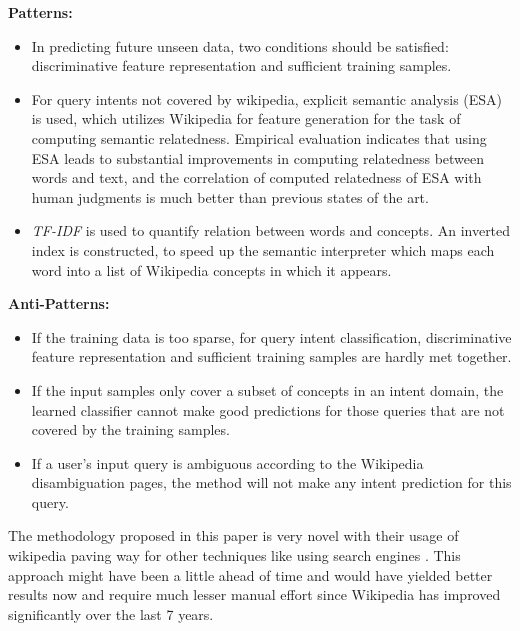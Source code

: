 \documentclass{report}
\begin{document}
\textbf{Patterns:}
\begin{itemize}
\item In predicting future unseen data, two conditions should be satisfied: discriminative feature 
representation and sufficient training samples.
\item For query intents not covered by wikipedia, explicit semantic analysis (ESA) is used, which utilizes
Wikipedia for feature generation for the task of computing semantic relatedness. Empirical evaluation 
indicates that using ESA leads to substantial improvements in computing relatedness between words and text, 
and the correlation of computed relatedness of ESA with human judgments is much better than previous states
of the art.
\item \textit{TF-IDF} is used to quantify relation between words and concepts. An inverted index is constructed,
to speed up the semantic interpreter which maps each word into a list of Wikipedia concepts in which it appears.
\end{itemize}

\textbf{Anti-Patterns:}
\begin{itemize}
\item If the training data is too sparse, for query intent classification, discriminative feature representation
and sufficient training samples are hardly met together.
\item If the input samples only cover a subset of concepts in an intent domain, the learned classifier cannot
make good predictions for those queries that are not covered by the training samples.
\item If a user's input query is ambiguous according to the Wikipedia disambiguation pages, the method will not
make any intent prediction for this query.
\end{itemize}

The methodology proposed in this paper is very novel with their usage of wikipedia paving way for other techniques
like using search engines \cite{gibiec10}. This approach might have been a little ahead of time and would have 
yielded better results now and require much lesser manual effort since Wikipedia has improved significantly 
over the last 7 years.
\end{document}
